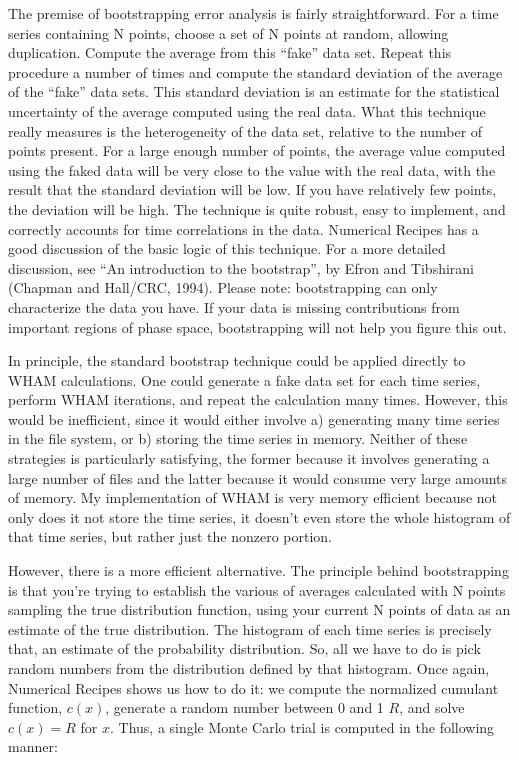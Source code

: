 \documentclass[12pt]{article}
\begin{document}
The premise of bootstrapping error analysis is fairly straightforward.  For
a time series containing N points, choose a set of N points at random,
allowing duplication.  Compute the average from this ``fake'' data set.
Repeat this procedure a number of times and compute the standard deviation
of the average of the ``fake'' data sets.  This standard deviation is an
estimate for the statistical uncertainty of the average computed using the
real data.  What this technique really measures is the heterogeneity of the
data set, relative to the number of points present.  For a large enough
number of points, the average value computed using the faked data will be
very close to the value with the real data, with the result that the
standard deviation will be low.  If you have relatively few points, the
deviation will be high.  The technique is quite robust, easy to implement,
and correctly accounts for time correlations in the data.  Numerical
Recipes has a good discussion of the basic logic of this technique.  For a
more detailed discussion, see ``An introduction to the bootstrap'', by Efron
and Tibshirani (Chapman and Hall/CRC, 1994).  Please note: bootstrapping can
only characterize the data you have.  If your data is missing contributions
from important regions of phase space, bootstrapping will not help you figure
this out.

In principle, the standard bootstrap technique could be applied directly to
WHAM calculations.  One could generate a fake data set for each time
series, perform WHAM iterations, and repeat the calculation many times.
However, this would be inefficient, since it would either involve a)
generating many time series in the file system, or b) storing the time
series in memory.  Neither of these strategies is particularly satisfying,
the former because it involves generating a large number of files and the
latter because it would consume very large amounts of memory.
My implementation of WHAM is very memory efficient because not only does it
not store the time series, it doesn't even store the whole histogram of
that time series, but rather just the nonzero portion.

However, there is a more efficient alternative.  The principle behind
bootstrapping is that you're trying to establish the various of averages
calculated with N points sampling the true distribution function, using
your current N points of data as an estimate of the true distribution.
The histogram of each time series is precisely that, an estimate of the
probability distribution.  So, all we have to do is pick random numbers
from the distribution defined by that histogram.  Once again, Numerical
Recipes shows us how to do it: we compute the normalized cumulant function,
$c(x)$, generate a random number between 0 and 1 $R$, and solve $c(x) = R$
for $x$.  Thus, a single Monte Carlo trial is computed in the following manner:
\end{document}
